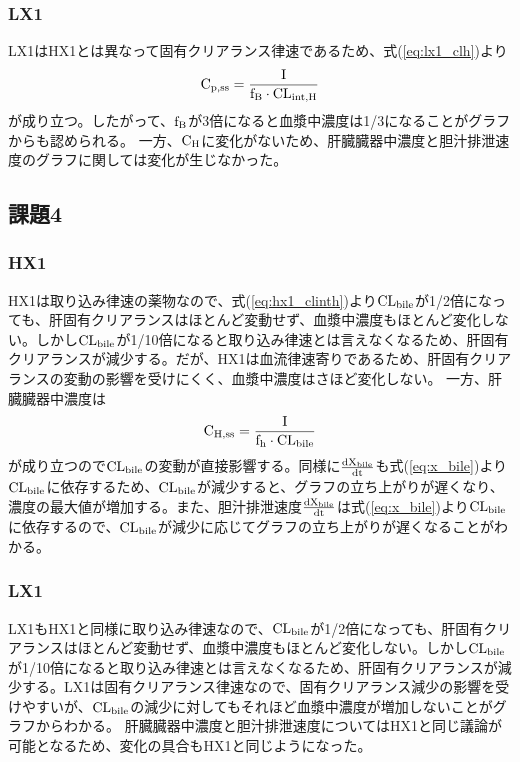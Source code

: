 \documentclass[a4paper,papersize,dvipdfmx]{jsarticle}
\begin{document}
\subsubsection*{LX1}

LX1はHX1とは異なって固有クリアランス律速であるため、式(\ref{eq:lx1_clh})より
\[\rm C_{p,ss} =  \frac{I}{f_B \cdot CL_{int,H}}\]
が成り立つ。したがって、$\rm f_B$が3倍になると血漿中濃度は1/3になることがグラフからも認められる。
一方、$\rm C_H$に変化がないため、肝臓臓器中濃度と胆汁排泄速度のグラフに関しては変化が生じなかった。

\subsection*{課題4}

\subsubsection*{HX1}

HX1は取り込み律速の薬物なので、式(\ref{eq:hx1_clinth})より$\rm CL_{bile}$が1/2倍になっても、肝固有クリアランスはほとんど変動せず、血漿中濃度もほとんど変化しない。しかし$\rm CL_{bile}$が1/10倍になると取り込み律速とは言えなくなるため、肝固有クリアランスが減少する。だが、HX1は血流律速寄りであるため、肝固有クリアランスの変動の影響を受けにくく、血漿中濃度はさほど変化しない。
一方、肝臓臓器中濃度は
\[\rm C_{H,ss} = \frac{I}{f_h \cdot CL_{bile}}\]
が成り立つので$\rm CL_{bile}$の変動が直接影響する。同様に$\rm \frac{dX_{bile}}{dt}$も式(\ref{eq:x_bile})より$\rm CL_{bile}$に依存するため、$\rm CL_{bile}$が減少すると、グラフの立ち上がりが遅くなり、濃度の最大値が増加する。また、胆汁排泄速度$\rm \frac{dX_{bile}}{dt}$は式(\ref{eq:x_bile})より$\rm CL_{bile}$に依存するので、$\rm CL_{bile}$が減少に応じてグラフの立ち上がりが遅くなることがわかる。

\subsubsection*{LX1}

LX1もHX1と同様に取り込み律速なので、$\rm CL_{bile}$が1/2倍になっても、肝固有クリアランスはほとんど変動せず、血漿中濃度もほとんど変化しない。しかし$\rm CL_{bile}$が1/10倍になると取り込み律速とは言えなくなるため、肝固有クリアランスが減少する。LX1は固有クリアランス律速なので、固有クリアランス減少の影響を受けやすいが、$\rm CL_{bile}$の減少に対してもそれほど血漿中濃度が増加しないことがグラフからわかる。
肝臓臓器中濃度と胆汁排泄速度についてはHX1と同じ議論が可能となるため、変化の具合もHX1と同じようになった。
\end{document}
